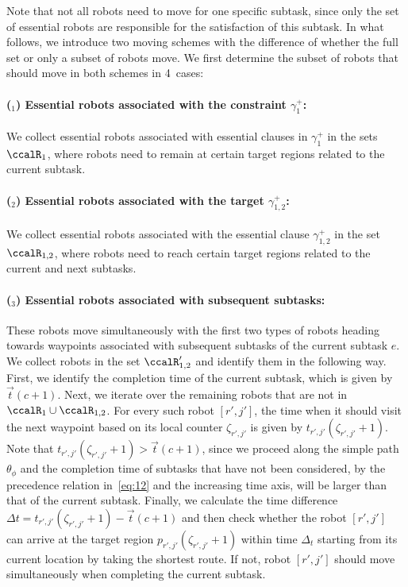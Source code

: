 \documentclass[Afour,sageh,times]{sagej}
\newcounter{mycounter}
\begin{document}
{{ Note that not all robots need to move for one specific subtask, since only the set of essential robots are responsible for the satisfaction of this subtask. In what follows, we introduce two moving schemes with the difference of whether the full set or only a subset of robots move.   We first determine the subset of robots that should move in both schemes in 4\ cases:
 \paragraph{($_1$) Essential robots associated with the constraint $\gamma_1^+$:} We collect essential robots associated with essential clauses in $\gamma_{1}^{+}$ in the sets $\ccalR_{1}$,  where robots need to remain at certain target regions related to the current subtask.
 \paragraph{($_2$) Essential robots associated with the target $\gamma_{1,2}^{+}$:}  We collect essential robots associated with the essential clause  $\gamma_{1,2}^{+}$ in the set $\ccalR_{1,2}$, where  robots need to reach certain target regions related to the current and next subtasks.
 \paragraph{($_3$) Essential robots associated with subsequent subtasks:} These robots move simultaneously with the first two types of robots heading towards  waypoints associated with subsequent subtasks of the current subtask $e$. We collect robots in the set $\ccalR'_{1,2}$ and identify them in the following way. First, we identify the completion time  of the current subtask, which is given by $\vec{t}(c+1)$.  Next, we iterate over the remaining robots that are not in $\ccalR_1 \cup \ccalR_{1,2}$. For every such robot $[r',j']$, the time when it should visit the next waypoint based on its local counter $\zeta_{r',j'}$ is given by $t_{r',j'}(\zeta_{r',j'}+1)$. Note that {$t_{r', j'}(\zeta_{r',j'}+1) > \vec{t}(c+1)$}, since we proceed along the simple path $\theta_{\phi}$ and the completion time of  subtasks that have not been considered, by the precedence relation in~\eqref{eq:12} and the increasing time axis, will be larger than that of the current subtask. Finally, we calculate the time difference $\Delta t = t_{r', j'}(\zeta_{r',j'}+1) - \vec{t}(c+1)$  and then check whether the robot $[r', j']$ can arrive at the target region $p_{r',j'}(\zeta_{r',j'}+1)$  within time $\Delta_t$ starting from  its current location by taking the shortest route. {If not, robot $[r', j']$ should move simultaneously when completing the current subtask.}
}}
\end{document}
